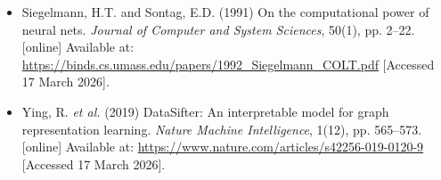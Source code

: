 \documentclass{article}
\begin{document}
\begin{itemize}
\item Siegelmann, H.T. and Sontag, E.D. (1991) On the computational power of neural nets. \emph{Journal of Computer and System Sciences}, 50(1), pp. 2--22. [online] Available at: \url{https://binds.cs.umass.edu/papers/1992_Siegelmann_COLT.pdf} [Accessed 17 March 2026]. %

\item Ying, R. \emph{et al.} (2019) DataSifter: An interpretable model for graph representation learning. \emph{Nature Machine Intelligence}, 1(12), pp. 565--573. [online] Available at: \url{https://www.nature.com/articles/s42256-019-0120-9} [Accessed 17 March 2026]. %
\end{itemize}
\end{document}
